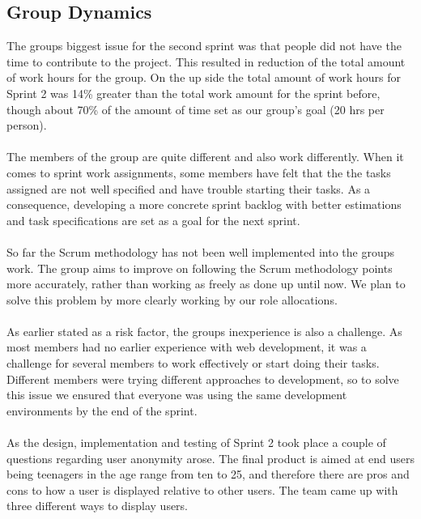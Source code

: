 \subsection{Group Dynamics}
\label{subsec:S2RetrospectiveDynamics}
The groups biggest issue for the second sprint was that people did not have the time to contribute to the project. This resulted in reduction of the total amount of work hours for the group. On the up side the total amount of work hours for Sprint 2 was 14\% greater than the total work amount for the sprint before, though about 70\% of the amount of time set as our group's goal (20 hrs per person).

\paragraph{} The members of the group are quite different and also work differently. When it comes to sprint work assignments, some members have felt that the the tasks assigned are not well specified and have trouble starting their tasks. As a consequence, developing a more concrete sprint backlog with better estimations and task specifications are set as a goal for the next sprint.

\paragraph{} So far the Scrum methodology has not been well implemented into the groups work. The group aims to improve on following the Scrum methodology points more accurately, rather than working as freely as done up until now. We plan to solve this problem by more clearly working by our role allocations.

\paragraph{} As earlier stated as a risk factor, the groups inexperience is also a challenge. As most members had no earlier experience with web development, it was a challenge for several members to work effectively or start doing their tasks. Different members were trying different approaches to development, so to solve this issue we ensured that everyone was using the same development environments by the end of the sprint. 

\paragraph{} As the design, implementation and testing of Sprint 2 took place a couple of questions regarding user anonymity arose. The final product is aimed at end users being teenagers in the age range from ten to 25, and therefore there are pros and cons to how a user is displayed relative to other users. The team came up with three different ways to display users. 

